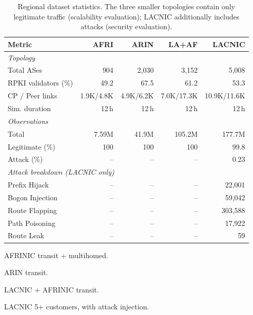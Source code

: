\documentclass[conference]{IEEEtran}
\begin{document}
\begin{table}[t]
  \caption{Regional dataset statistics. The three smaller topologies contain only legitimate traffic (scalability evaluation); LACNIC additionally includes attacks (security evaluation).}
  \label{tab:dataset_stats}
  \begin{threeparttable}
    \footnotesize
    \setlength{\tabcolsep}{4pt}
    \begin{tabular*}{\columnwidth}{l @{\extracolsep{\fill}} rrrr}
      \toprule
      \textbf{Metric} & \textbf{AFRI}\tnote{a} & \textbf{ARIN}\tnote{b} &
      \textbf{LA+AF}\tnote{c} & \textbf{LACNIC}\tnote{d} \\
      \midrule
      \textit{Topology} \\
      \quad Total ASes            & 904     & 2{,}030  & 3{,}152  & 5{,}008 \\
      \quad RPKI validators (\%)  & 49.2    & 67.5     & 61.2     & 53.3 \\
      \quad CP / Peer links       & 1.9K/4.8K & 4.9K/6.2K & 7.0K/17.3K & 10.9K/11.6K \\
      \quad Sim. duration          & 12\,h   & 12\,h    & 12\,h    & 12\,h \\
      \midrule
      \textit{Observations} \\
      \quad Total                 & 7.59M   & 41.9M    & 105.2M   & 177.7M \\
      \quad Legitimate (\%)       & 100     & 100      & 100      & 99.8 \\
      \quad Attack (\%)           & --      & --       & --       & 0.23 \\
      \midrule
      \multicolumn{5}{l}{\textit{Attack breakdown (LACNIC only)}} \\
      \quad Prefix Hijack         & -- & -- & -- & 22{,}001 \\
      \quad Bogon Injection       & -- & -- & -- & 59{,}042 \\
      \quad Route Flapping        & -- & -- & -- & 303{,}588 \\
      \quad Path Poisoning        & -- & -- & -- & 17{,}922 \\
      \quad Route Leak            & -- & -- & -- & 59 \\
      \bottomrule
    \end{tabular*}
    \begin{tablenotes}
      \footnotesize
      \item[a] AFRINIC transit + multihomed.
      \item[b] ARIN transit.
      \item[c] LACNIC + AFRINIC transit.
      \item[d] LACNIC 5+ customers, with attack injection.
    \end{tablenotes}
  \end{threeparttable}
\end{table}
\end{document}
